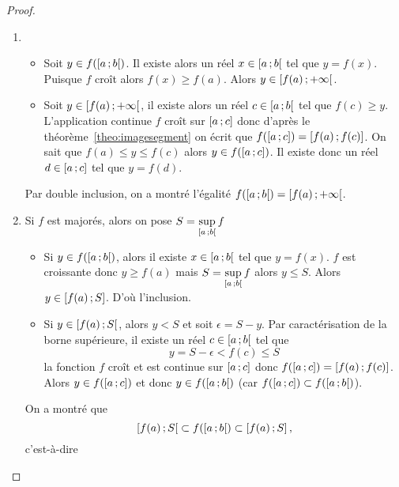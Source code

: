 \begin{proof}
  \begin{enumerate}
  \item
    \begin{itemize}
    \item Soit $y \in f(\left[ a \, ;  b \right[)$. Il existe alors un réel $x \in \left[ a \, ;  b \right[$ tel que $y=f(x)$. Puisque $f$ croît alors $f(x) \geqslant f(a)$. Alors $y \in \left[ f(a) \, ;  +\infty \right[$.
    \item Soit $y \in \left[ f(a) \, ;  +\infty \right[$, il existe alors un réel $c \in \left[ a \, ;  b \right[$ tel que $f(c) \geqslant y$. L'application continue $f$ croît sur $\left[ a \, ;  c \right]$ donc d'après le théorème~\ref{theo:imagesegment} on écrit que $f(\left[ a \, ;  c \right])=\left[ f(a) \, ;  f(c) \right]$. On sait que $f(a) \le y \leqslant f(c)$ alors $y \in f(\left[ a \, ;  c \right])$. Il existe donc un réel $d \in \left[ a \, ;  c \right]$ tel que $y=f(d)$.
    \end{itemize}
    Par double inclusion, on a montré l'égalité $f(\left[ a \, ;  b \right[)=\left[ f(a) \, ;  +\infty \right[$.
  \item Si $f$ est majorés, alors on pose $S=\sup\limits_{\left[ a \, ;  b \right[}f$
    \begin{itemize}
    \item Si $y \in f(\left[ a \, ;  b \right[)$, alors il existe $x \in \left[ a \, ;  b \right[$ tel que $y=f(x)$. $f$ est croissante donc $y \geqslant f(a)$ mais $S=\sup\limits_{\left[ a \, ;  b \right[}f$ alors $y \leqslant S$. Alors $y \in \left[ f(a) \, ;  S \right]$. D'où l'inclusion.
    \item Si $y \in \left[ f(a) \, ;  S \right[$, alors $y < S$ et soit $\epsilon=S-y$. Par caractérisation de la borne supérieure, il existe un réel $c \in \left[ a \, ;  b \right[$ tel que
      \begin{equation}
        y=S-\epsilon < f(c) \leqslant S
      \end{equation}
      la fonction $f$ croît et est continue sur $\left[ a \, ;  c \right]$ donc $f(\left[ a \, ;  c \right])=\left[ f(a) \, ;  f(c) \right]$. Alors $y \in f(\left[ a \, ;  c \right])$ et donc $y \in f(\left[ a \, ;  b \right[)$ (car $f(\left[ a \, ;  c \right]) \subset f(\left[ a \, ;  b \right[)$).
    \end{itemize}
    On a montré que
    \begin{equation}
      \left[ f(a) \, ;  S \right[ \subset f(\left[ a \, ;  b \right[) \subset \left[ f(a) \, ;  S \right],
    \end{equation}
    c'est-à-dire
    \begin{equation}

\end{equation}
\end{enumerate}
\end{proof}
